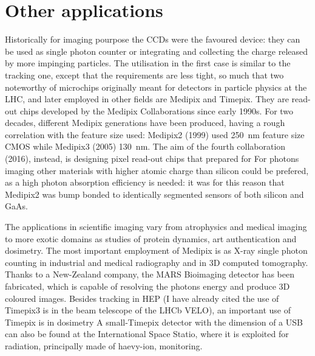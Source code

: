 \section{Other applications}
    Historically for imaging pourpose the CCDs were the favoured device: they can be used as single photon counter or integrating and collecting the charge released by more impinging particles. The utilisation in the first case is similar to the tracking one, except that the requirements are less tight, so much that two noteworthy of microchips originally meant for detectors in particle physics at the LHC, and later employed in other fields are Medipix and Timepix. They are read-out chips developed by the Medipix Collaborations since early 1990s. For two decades, different Medipix generations have been produced, having a rough correlation with the feature size used: Medipix2 (1999) used \SI{250}{nm} feature size CMOS while Medipix3 (2005) \SI{130}{nm}.
    The aim of the fourth collaboration (2016), instead, is designing pixel read-out chips that prepared for 
    For photons imaging other materials with higher atomic charge than silicon could be prefered, as a high photon absorption efficiency is needed: it was for this reason that Medipix2 was bump bonded to identically segmented sensors of both silicon and GaAs.
    
    The applications in scientific imaging vary from atrophysics and medical imaging to more exotic domains as studies of protein dynamics, art authentication and dosimetry.
    The most important employment of Medipix is as X-ray single photon counting in industrial and medical radiography and in 3D computed tomography. 
    Thanks to a New-Zealand company, the MARS Bioimaging detector has been fabricated, which is capable of resolving the photons energy and produce 3D coloured images.
    Besides tracking in HEP (I have already cited the use of Timepix3 is in the beam telescope of the LHCb VELO), an important use of Timepix is in dosimetry 
    A small-Timepix detector with the dimension of a USB can also be found at the International Space Statio, where it is exploited for radiation, principally made of haevy-ion, monitoring. 
 
